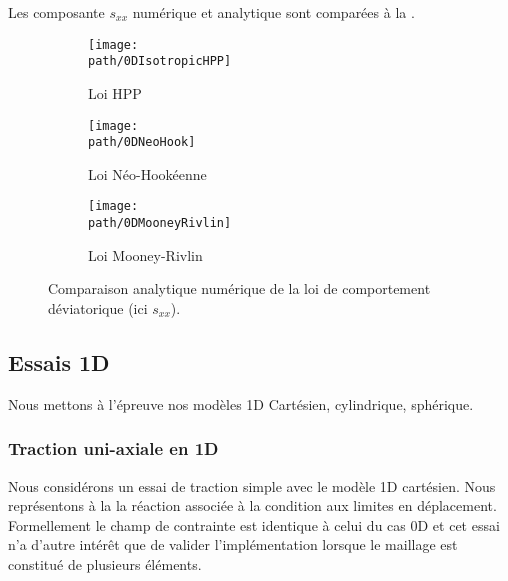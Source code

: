 \documentclass[10pt]{book}
\def\path{./fig}
\begin{document}
Les composante $s_{xx}$ numérique et analytique sont comparées à la .
\begin{figure}[h!]
\begin{subfigure}[b]{0.32\textwidth}
\centering \texttt{[image: \\path/0DIsotropicHPP]}
\caption{Loi HPP}
\label{fig:compa_s_HPP}
\end{subfigure}
\begin{subfigure}[b]{0.32\textwidth}
\centering \texttt{[image: \\path/0DNeoHook]}
\caption{Loi Néo-Hookéenne}
\label{fig:compa_s_NH}
\end{subfigure}
\begin{subfigure}[b]{0.32\textwidth}
\centering \texttt{[image: \\path/0DMooneyRivlin]}
\caption{Loi Mooney-Rivlin}
\label{fig:compa_s_MR}
\end{subfigure}
\caption{Comparaison analytique numérique de la loi de comportement déviatorique (ici $s_{xx}$).}
\label{fig:compa_loi_dev_analytique}
\end{figure}

\subsection{Essais 1D}
Nous mettons à l'épreuve nos modèles 1D Cartésien, cylindrique, sphérique.
\subsubsection{Traction uni-axiale en 1D}
Nous considérons un essai de traction simple avec le modèle 1D cartésien. Nous représentons à la  la réaction associée à la condition aux limites en déplacement. Formellement le champ de contrainte est identique à celui du cas 0D et cet essai n'a d'autre intérêt que de valider l'implémentation lorsque le maillage est constitué de plusieurs éléments.
\end{document}
